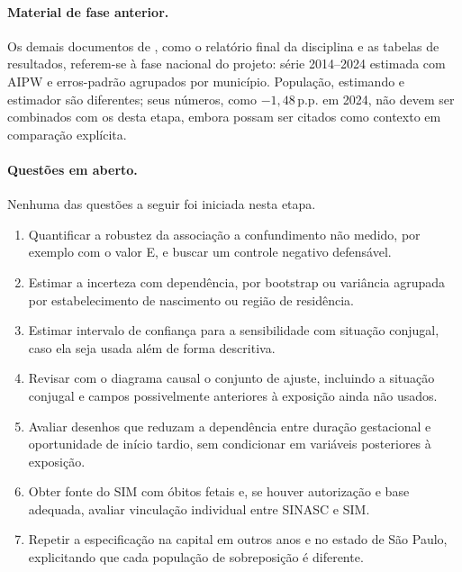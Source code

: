 \documentclass[11pt,a4paper]{article}
\newcommand{\pp}{\,p.p.}
\begin{document}
\paragraph{Material de fase anterior.} Os demais documentos de ,
como o relatório final da disciplina e as tabelas de resultados, referem-se à fase
nacional do projeto: série 2014--2024 estimada com AIPW e erros-padrão agrupados por
município. População, estimando e estimador são
diferentes; seus números, como $-1{,}48$\pp{} em 2024, não devem ser combinados com os
desta etapa, embora possam ser citados como contexto em comparação explícita.

\paragraph{Questões em aberto.} Nenhuma das questões a seguir foi iniciada nesta etapa.
\begin{enumerate}
\item Quantificar a robustez da associação a confundimento não medido, por exemplo com o
valor E, e buscar um controle negativo defensável.
\item Estimar a incerteza com dependência, por bootstrap ou variância agrupada por
estabelecimento de nascimento ou região de residência.
\item Estimar intervalo de confiança para a sensibilidade com situação conjugal, caso ela
seja usada além de forma descritiva.
\item Revisar com o diagrama causal o conjunto de ajuste, incluindo a situação conjugal e
campos possivelmente anteriores à exposição ainda não usados.
\item Avaliar desenhos que reduzam a dependência entre duração gestacional e oportunidade
de início tardio, sem condicionar em variáveis posteriores à exposição.
\item Obter fonte do SIM com óbitos fetais e, se houver autorização e base adequada,
avaliar vinculação individual entre SINASC e SIM.
\item Repetir a especificação na capital em outros anos e no estado de São Paulo,
explicitando que cada população de sobreposição é diferente.
\end{enumerate}

{\small{}}
\end{document}
